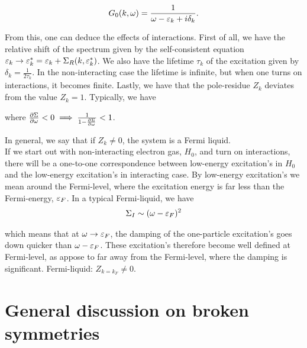 \begin{align*}
    G_0(k, \omega) = \frac{1}{\omega - \varepsilon_k + i \delta_k}. 
\end{align*}

From this, one can deduce the effects of interactions.  First of all, we have the relative shift of the spectrum given by the self-consistent equation $\varepsilon_k \to \varepsilon^*_k = \varepsilon_k + \Sigma_R(k, \varepsilon^*_k)$. We also have the lifetime $\tau_k$ of the excitation given by $\delta_k = \frac{1}{2\tau_k}$. In the non-interacting case the lifetime is infinite, but when one turns on interactions, it becomes finite. Lastly, we have that the pole-residue $Z_k$ deviates from the value $Z_k = 1$. Typically, we have \\ 

\begin{figure}
	\centering
    
\end{figure}

where $\pdv{\Sigma}{\omega} < 0 \implies \frac{1}{1 - \pdv{\Sigma}{\omega}} < 1$. 

\begin{figure}
	\centering
	
\end{figure}

In general, we say that if $Z_k \neq 0$, the system is a Fermi liquid. \\ 

If we start out with non-interacting electron gas, $H_0$, and turn on interactions, there will be a one-to-one correspondence between low-energy excitation's in $H_0$ and the low-energy excitation's in interacting case. By low-energy excitation's we mean around the Fermi-level, where the excitation energy is far less than the Fermi-energy, $\varepsilon_F$. In a typical Fermi-liquid, we have \\ 

\begin{align*}
    \Sigma_I \sim (\omega - \varepsilon_F)^2 
\end{align*}

which means that at $\omega \to \varepsilon_F$, the damping of the one-particle excitation's goes down quicker than $\omega - \varepsilon_F$. These excitation's therefore become well defined at Fermi-level, as appose to far away from the Fermi-level, where the damping is significant. Fermi-liquid: $Z_{k = k_F} \neq 0$. \\

\section{General discussion on broken symmetries}

